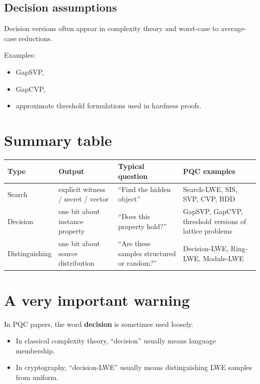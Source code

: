 \documentclass[11pt]{article}
\begin{document}
	\subsection{Decision assumptions}
	
	Decision versions often appear in complexity theory and worst-case to average-case reductions.
	
	Examples:
	\begin{itemize}
		\item GapSVP,
		\item GapCVP,
		\item approximate threshold formulations used in hardness proofs.
	\end{itemize}
	
	\section{Summary table}
	
	\begin{center}
		\renewcommand{\arraystretch}{1.35}
		\begin{tabular}{>{\raggedright\arraybackslash}p{2.5cm} >{\raggedright\arraybackslash}p{4.1cm} >{\raggedright\arraybackslash}p{4.5cm} >{\raggedright\arraybackslash}p{3cm}}
			\toprule
			\textbf{Type} & \textbf{Output} & \textbf{Typical question} & \textbf{PQC examples} \\
			\midrule
			Search & explicit witness / secret / vector & ``Find the hidden object'' & Search-LWE, SIS, SVP, CVP, BDD \\
			\midrule
			Decision & one bit about instance property & ``Does this property hold?'' & GapSVP, GapCVP, threshold versions of lattice problems \\
			\midrule
			Distinguishing & one bit about source distribution & ``Are these samples structured or random?'' & Decision-LWE, Ring-LWE, Module-LWE \\
			\bottomrule
		\end{tabular}
	\end{center}
	
	\section{A very important warning}
	
	In PQC papers, the word \textbf{decision} is sometimes used loosely.
	
	\begin{itemize}
		\item In classical complexity theory, ``decision'' usually means language membership.
		\item In cryptography, ``decision-LWE'' usually means distinguishing LWE samples from uniform.
	\end{itemize}
	
\end{document}
